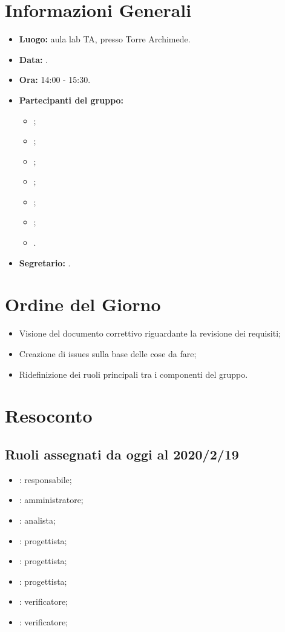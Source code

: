 \section{Informazioni Generali}
\begin{itemize}
\item \textbf{Luogo:} aula lab TA, presso Torre Archimede.
\item \textbf{Data:} \Data.
\item \textbf{Ora:} 14:00 - 15:30.
\item \textbf{Partecipanti del gruppo:}
	\begin{itemize}
		\item \AT{}; 
		\item \BR{};
		\item \CE{}; 
		\item \LD{};
		\item \MC{};
		\item \PF{};
		\item \SE{}.
	\end{itemize} 
\item \textbf{Segretario:} \CE{}.
\end{itemize}

\section{Ordine del Giorno}
\begin{itemize}
	\item Visione del documento correttivo riguardante la revisione dei requisiti;
	\item Creazione di issues sulla base delle cose da fare;
	\item Ridefinizione dei ruoli principali tra i componenti del gruppo.
\end{itemize}


\section{Resoconto}

\subsection{Ruoli assegnati da oggi al 2020/2/19}
\begin{itemize}
	\item \MC{}: responsabile;
	\item \EC{}: amministratore;
	\item \AT{}: analista;
	\item \LD{}: progettista; 
	\item \DF{}: progettista;
	\item \SE{}: progettista;
	\item \PF{}: verificatore;
	\item \BR{}: verificatore;
\end{itemize}\\

